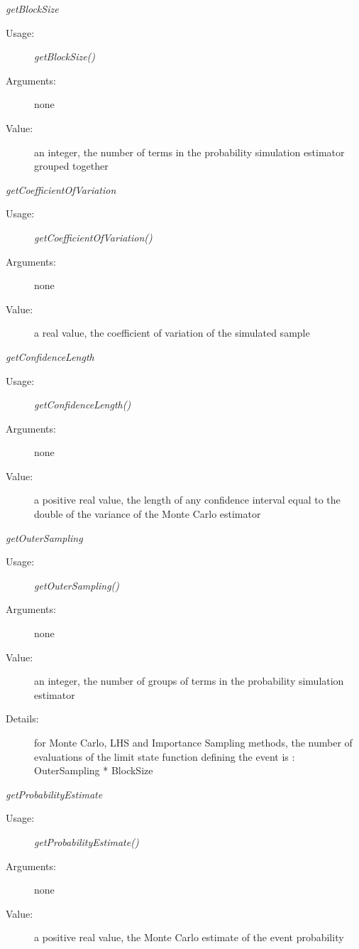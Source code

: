 \begin{description}
\begin{description}
\item \textit{getBlockSize}
\begin{description}
\item[Usage:] \textit{getBlockSize()}
\item[Arguments:] none
\item[Value:]  an integer, the number of terms in the probability simulation estimator grouped together
\end{description}
\bigskip

\item \textit{getCoefficientOfVariation}
\begin{description}
\item[Usage:] \textit{getCoefficientOfVariation()}
\item[Arguments:] none
\item[Value:]  a real value,  the coefficient of variation of the simulated sample
\end{description}
\bigskip

\item \textit{getConfidenceLength}
\begin{description}
\item[Usage:] \textit{getConfidenceLength()}
\item[Arguments:] none
\item[Value:]  a positive real value, the length of any confidence interval equal to the double of the variance of the Monte Carlo estimator
\end{description}
\bigskip

\item \textit{getOuterSampling}
\begin{description}
\item[Usage:] \textit{getOuterSampling()}
\item[Arguments:] none
\item[Value:]  an integer,  the number of groups of terms in the probability simulation estimator
\item[Details:]  for Monte Carlo,  LHS and Importance Sampling methods, the  number of evaluations of the limit state function defining the event is : OuterSampling * BlockSize
\end{description}
\bigskip

\item \textit{getProbabilityEstimate}
\begin{description}
\item[Usage:] \textit{getProbabilityEstimate()}
\item[Arguments:] none
\item[Value:]  a positive real value, the Monte Carlo estimate of the event probability
\end{description}
\bigskip


\end{description}
\end{description}
